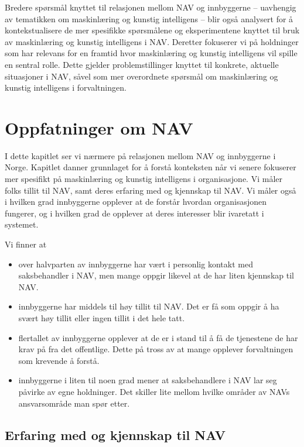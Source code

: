 \documentclass[
]{book}
\begin{document}
Bredere spørsmål knyttet til relasjonen mellom NAV og innbyggerne -- uavhengig av tematikken om maskinlæring og kunstig intelligens -- blir også analysert for å kontekstualisere de mer spesifikke spørsmålene og eksperimentene knyttet til bruk av maskinlæring og kunstig intelligens i NAV.
Deretter fokuserer vi på holdninger som har relevans for en framtid hvor maskinlæring og kunstig intelligens vil spille en sentral rolle.
Dette gjelder problemstillinger knyttet til konkrete, aktuelle situasjoner i NAV, såvel som mer overordnete spørsmål om maskinlæring og kunstig intelligens i forvaltningen.

\hypertarget{oppfatninger-om-nav}{%
\chapter{Oppfatninger om NAV}\label{oppfatninger-om-nav}}

I dette kapitlet ser vi nærmere på relasjonen mellom NAV og innbyggerne i Norge.
Kapitlet danner grunnlaget for å forstå konteksten når vi senere fokuserer mer spesifikt på maskinlæring og kunstig intelligens i organisasjone.
Vi måler folks tillit til NAV, samt deres erfaring med og kjennskap til NAV.
Vi måler også i hvilken grad innbyggerne opplever at de forstår hvordan organisasjonen fungerer, og i hvilken grad de opplever at deres interesser blir ivaretatt i systemet.

Vi finner at

\begin{itemize}
\item
  over halvparten av innbyggerne har vært i personlig kontakt med saksbehandler i NAV, men mange oppgir likevel at de har liten kjennskap til NAV.
\item
  innbyggerne har middels til høy tillit til NAV. Det er få som oppgir å ha svært høy tillit eller ingen tillit i det hele tatt.
\item
  flertallet av innbyggerne opplever at de er i stand til å få de tjenestene de har krav på fra det offentlige. Dette på tross av at mange opplever forvaltningen som krevende å forstå.
\item
  innbyggerne i liten til noen grad mener at saksbehandlere i NAV lar seg påvirke av egne holdninger. Det skiller lite mellom hvilke områder av NAVs ansvarsområde man spør etter.
\end{itemize}

\hypertarget{erfaring-med-og-kjennskap-til-nav}{%
\section{Erfaring med og kjennskap til NAV}\label{erfaring-med-og-kjennskap-til-nav}}
\end{document}
